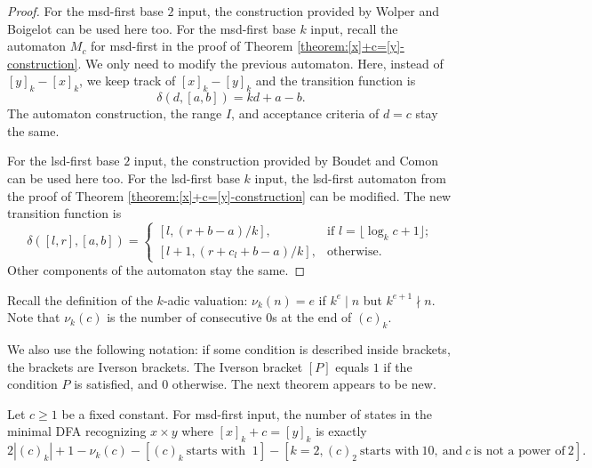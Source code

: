 \documentclass[12pt,reqno]{article}
\begin{document}
\begin{proof}
    For the msd-first base $2$ input, the construction provided by Wolper and Boigelot \cite{wolper_construction_2000} can be used here too.
    For the msd-first base $k$ input, recall the automaton $M_c$ for msd-first in the proof of Theorem \ref{theorem:[x]+c=[y]-construction}. We only need to modify the previous automaton. Here, instead of $[y]_k-[x]_k$, we keep track of $[x]_k - [y]_k$ and the transition function is
    \[
    \delta(d, [a, b]) = kd + a - b.
    \]
    The automaton construction, the range $I$, and acceptance criteria of $d=c$ stay the same.

    For the lsd-first base $2$ input, the construction provided by Boudet and Comon \cite{boudet_diophantine_1996} can be used here too.
    For the lsd-first base $k$ input, the lsd-first automaton from the proof of Theorem \ref{theorem:[x]+c=[y]-construction} can be modified. The new transition function is
    \[
    \delta([l, r], [a, b]) =
    \begin{cases}
    [l, (r+b - a)/k], &  \text{if $l= \lfloor \log_k c + 1 \rfloor$}; \\
    [l+1, (r+ c_l + b - a)/k], & \text{otherwise.}
    \end{cases}
    \]
    Other components of the automaton stay the same.
\end{proof}

Recall the definition of the $k$-adic valuation: $\nu_k (n) = e$ if $k^e \mid n$ but $k^{e+1} \nmid n$. 
Note that $\nu_k(c)$ is the number of consecutive $0$s at the end of $(c)_k$. 

We also use the following notation:  if some condition is described inside brackets, the brackets are Iverson brackets. The Iverson bracket $[P]$ equals $1$ if the condition $P$ is satisfied, and $0$ otherwise.  The next theorem appears to be new.
\begin{theorem} \label{theorem:+c-sc-formula}
Let $c \geq 1$ be a fixed constant.
For msd-first input, the number of states in the minimal DFA recognizing $x \times y$ where $[x]_k + c = [y]_k$ is exactly
\begin{equation}
2|(c)_k| + 1 - \nu_k(c) - [(c)_k \ \text{starts with } \ 1] - [k=2, (c)_2 \ \text{starts with} \ 10, \ \text{and} \ c \ \text{is not a power of} \ 2].
\label{eq22}
\end{equation}
\end{theorem}
\end{document}
